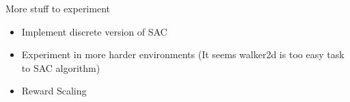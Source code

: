 \documentclass[8pt]{beamer}
\newcommand{\tb}[1]{\textbf{#1}}
\begin{document}
\begin{frame}{More stuff to experiment}
    \begin{itemize}
        \item Implement discrete version of SAC
        \item Experiment in more harder environments (It seems walker2d is too easy task to SAC algorithm)
        \item Reward Scaling
    \end{itemize}
\end{frame}





\end{document}
